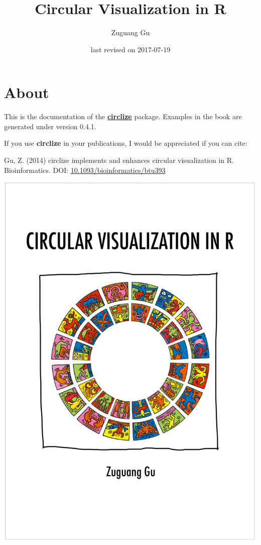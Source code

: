 \documentclass[]{book}
\title{Circular Visualization in R}
\author{Zuguang Gu}
\date{last revised on 2017-07-19}
\theoremstyle{definition}
\theoremstyle{definition}
\theoremstyle{remark}
\begin{document}
\maketitle

{
\setcounter{tocdepth}{1}
\tableofcontents
}
\chapter*{About}\label{about}

This is the documentation of the
\href{https://cran.r-project.org/package=circlize}{\textbf{circlize}}
package. Examples in the book are generated under version 0.4.1.

If you use \textbf{circlize} in your publications, I would be
appreciated if you can cite:

Gu, Z. (2014) circlize implements and enhances circular visualization in
R. Bioinformatics. DOI:
\href{https://doi.org/10.1093/bioinformatics/btu393}{10.1093/bioinformatics/btu393}

\begin{center}\includegraphics[width=34.44in]{images/circlize_cover} \end{center}
\end{document}
